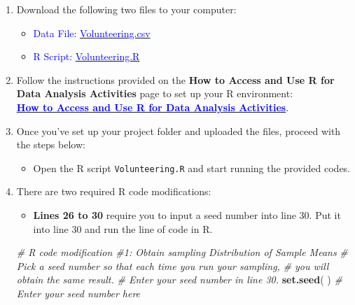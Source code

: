 \documentclass[oneside,openany]{book}
\newenvironment{Shaded}{\begin{snugshade}}{\end{snugshade}}
\newcommand{\CommentTok}[1]{\textcolor[rgb]{0.56,0.35,0.01}{\textit{#1}}}
\newcommand{\FunctionTok}[1]{\textcolor[rgb]{0.13,0.29,0.53}{\textbf{#1}}}
\newcommand{\NormalTok}[1]{#1}
\providecommand{\tightlist}{%
  \setlength{\itemsep}{0pt}\setlength{\parskip}{0pt}}
\begin{document}
\begin{enumerate}
\def\labelenumi{\arabic{enumi}.}
\item
  Download the following two files to your computer:

  \begin{itemize}
  \tightlist
  \item
    {\textcolor{blue}{Data File: }}\href{https://raw.githubusercontent.com/aslemand/Data-Analysis-Activities/main/data/Activity_4/Volunteering.csv}{\textcolor{blue}{Volunteering.csv}}
  \item
    {\textcolor{blue}{R Script:} }\href{https://raw.githubusercontent.com/aslemand/Data-Analysis-Activities/main/data/Activity_4/Volunteering.R}{\textcolor{blue}{Volunteering.R}}
  \end{itemize}
\item
  Follow the instructions provided on the \textbf{How to Access and Use R for Data Analysis Activities} page to set up your R environment:\\
  \hyperref[how-to-set-up-r-for-data-analysis-activities]{\textcolor{blue}{\textbf{How to Access and Use R for Data Analysis Activities}}}.
\item
  Once you've set up your project folder and uploaded the files, proceed with the steps below:

  \begin{itemize}
  \tightlist
  \item
    Open the R script \texttt{Volunteering.R} and start running the provided codes.
  \end{itemize}
\item
  There are two required R code modifications:

  \begin{itemize}
  \tightlist
  \item
    \textbf{Lines 26 to 30} require you to input a seed number into line 30. Put it into line 30 and run the line of code in R.
  \end{itemize}

\begin{Shaded}
\begin{Highlighting}[]
\CommentTok{\# R code modification \#1: Obtain sampling Distribution of Sample Means}
\CommentTok{\# Pick a seed number so that each time you run your sampling,}
\CommentTok{\# you will obtain the same result.}
\CommentTok{\# Enter your seed number in line 30.}
\FunctionTok{set.seed}\NormalTok{( ) }\CommentTok{\# Enter your seed number here}
\end{Highlighting}
\end{Shaded}


\end{enumerate}
\end{document}
